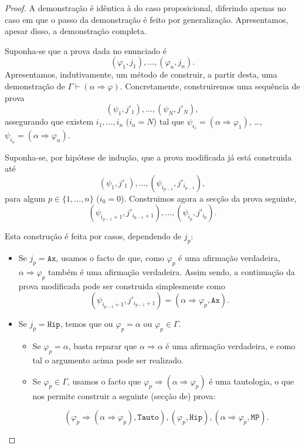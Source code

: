 \documentclass{report}
\theoremstyle{definition}
\theoremstyle{remark}
\newcommand{\imply}{\mathbin{\Rightarrow}}
\begin{document}
	\begin{proof}
	A demonstração é idêntica à do caso proposicional, diferindo apenas no caso em que o passo da demonstração é feito por generalização. Apresentamos, apesar disso, a demonstração completa.
	
	Suponha-se que a prova dada no enunciado é
	\[(\varphi_1, j_1), \dots, (\varphi_n, j_n).\]
	Apresentamos, indutivamente, um método de construir, a partir desta, uma demonstração de $\Gamma \vdash (\alpha \imply \varphi)$. Concretamente, construiremos uma sequência de prova
	\[(\psi_1, j'_1), \dots, (\psi_N, j'_N),\]
	assegurando que existem $i_1, \dots, i_n$ ($i_n = N$) tal que $\psi_{i_1} = (\alpha \imply \varphi_1)$, \dots, $\psi_{i_n} = (\alpha \imply \varphi_n)$.
	
	Suponha-se, por hipótese de indução, que a prova modificada já está construida até
	\[(\psi_1, j'_1), \dots, (\psi_{i_{p-1}}, j'_{i_{p-1}}),\]
	para algum $p \in \{1, \dots, n\}$ ($i_0 = 0$). Construimos agora a secção da prova seguinte,
	\[(\psi_{i_{p-1}+1}, j'_{i_{p-1}+1}), \dots, (\psi_{i_p}, j'_{i_p}).\]
	
	Esta construção é feita por casos, dependendo de $j_p$:
	
	\begin{itemize}
	\item Se $j_p = \mathtt{Ax}$, usamos o facto de que, como $\varphi_p$ é uma afirmação verdadeira, $\alpha \imply \varphi_p$ também é uma afirmação verdadeira. Assim sendo, a continuação da prova modificada pode ser construida simplesmente como
	\[(\psi_{i_{p-1}+1}, j'_{i_{p-1}+1}) = (\alpha \imply \varphi_p, \mathtt{Ax}).\]
	
	\item Se $j_p = \mathtt{Hip}$, temos que ou $\varphi_p = \alpha$ ou $\varphi_p \in \Gamma$.
	
	\begin{itemize}
	\item Se $\varphi_p = \alpha$, basta reparar que $\alpha \imply \alpha$ é uma afirmação verdadeira, e como tal o argumento acima pode ser realizado.
	
	\item Se $\varphi_p \in \Gamma$, usamos o facto que $\varphi_p \imply (\alpha \imply \varphi_p)$ é uma tautologia, o que nos permite construir a seguinte (secção de) prova:
	
	\[(\varphi_p \imply (\alpha \imply \varphi_p), \mathtt{Tauto}), (\varphi_p, \mathtt{Hip}), (\alpha \imply \varphi_p, \mathtt{MP}).\]
	\end{itemize}
	

\end{itemize}
\end{proof}
\end{document}
